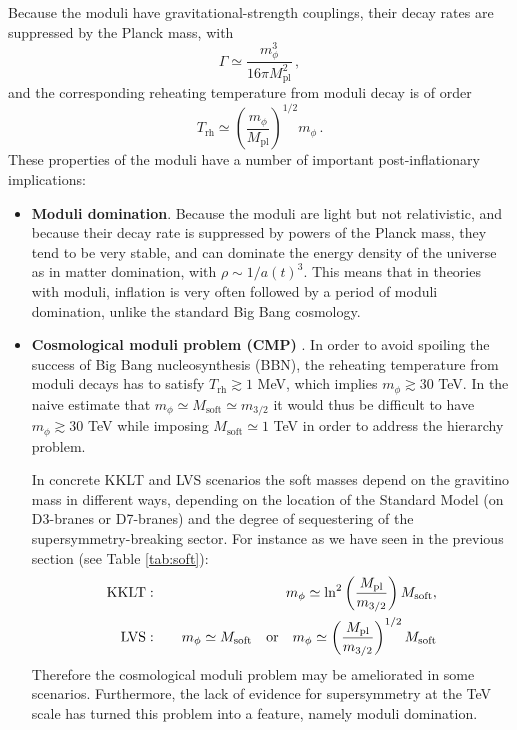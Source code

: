 \documentclass[12pt,a4wide]{article}
\def\be{\begin{equation}}
\def\ee{\end{equation}}
\begin{document}
Because the moduli have gravitational-strength couplings, their decay rates are suppressed by the Planck mass, with
\be
\Gamma\simeq \frac{m_\phi^3}{16\pi M_{\text{pl}}^2}\,,
\ee
and the corresponding reheating temperature from moduli decay is of order
\be
T_{\text{rh}}\simeq \left(\frac{m_\phi}{M_{\text{pl}}}\right)^{1/2} m_\phi\,.
\ee
These properties of the moduli have a number of important post-inflationary implications:

\begin{itemize}
    \item {\bf Moduli domination}. Because the moduli are light but not relativistic, and because their decay rate is suppressed by powers of the Planck mass, they tend to be very stable, and can dominate the energy density of the universe as in matter domination, with $\rho\sim 1/a(t)^3$. This means that 
    in theories with moduli, inflation is very often followed by a period of moduli domination, unlike the standard Big Bang cosmology.

    \item {\bf Cosmological moduli problem (CMP)} \cite{Coughlan:1983ci, Banks:1993en, deCarlos:1993wie}. In order to avoid spoiling the success of Big Bang nucleosynthesis (BBN), the reheating temperature from moduli decays has to satisfy  $T_{\text{rh}}\gtrsim 1$ MeV, which implies $m_\phi\gtrsim 30$ TeV. In the naive estimate that $m_\phi \simeq M_{\text{soft}}\simeq m_{3/2}$ it would thus be difficult to have $m_\phi \gtrsim 30 $ TeV while imposing $M_{\text{soft}}\simeq 1$ TeV in order to address the hierarchy problem.
    
    In concrete KKLT and LVS scenarios the soft masses depend on the gravitino mass in different ways, depending on the location of the Standard Model (on D3-branes or D7-branes) and the degree of sequestering of the supersymmetry-breaking sector. For instance as we have seen in the previous section (see Table \ref{tab:soft}): 
    \begin{eqnarray}
    \hbox{KKLT}: && \quad m_\phi\simeq \ln^2\left(\frac{M_{\text{pl}}}{m_{3/2}}
    \right)M_{\text{soft}},\nonumber \\
    \hbox{LVS}: && \quad m_\phi \simeq M_{\text{soft}}\quad \hbox{or}\quad  m_\phi \simeq\left(\frac{M_{\text{pl}}}{m_{3/2}}\right)^{1/2} M_{\text{soft}}
    \end{eqnarray}
    Therefore the cosmological moduli problem may be ameliorated in some scenarios. Furthermore, the lack of evidence for supersymmetry at the TeV scale has turned this problem into a feature, namely moduli domination.


\end{itemize}
\end{document}
